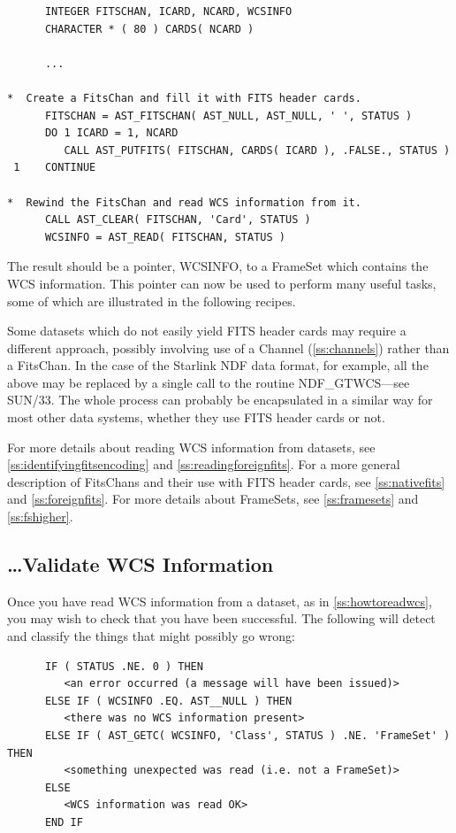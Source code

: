 \documentclass[twoside,11pt]{article}
\newcommand{\htmlref}[2]{#1}
\newcommand{\xref}[3]{#1}
\newcommand{\secref}[1]{\S\ref{#1}}
\renewcommand{\secref}[1]{\ref{#1}}
\begin{document}
\small
\begin{verbatim}
      INTEGER FITSCHAN, ICARD, NCARD, WCSINFO
      CHARACTER * ( 80 ) CARDS( NCARD )

      ...

*  Create a FitsChan and fill it with FITS header cards.
      FITSCHAN = AST_FITSCHAN( AST_NULL, AST_NULL, ' ', STATUS )
      DO 1 ICARD = 1, NCARD
         CALL AST_PUTFITS( FITSCHAN, CARDS( ICARD ), .FALSE., STATUS )
 1    CONTINUE

*  Rewind the FitsChan and read WCS information from it.
      CALL AST_CLEAR( FITSCHAN, 'Card', STATUS )
      WCSINFO = AST_READ( FITSCHAN, STATUS )
\end{verbatim}
\normalsize

The result should be a pointer, WCSINFO, to a \htmlref{FrameSet}{FrameSet} which contains
the WCS information. This pointer can now be used to perform many
useful tasks, some of which are illustrated in the following recipes.

Some datasets which do not easily yield FITS header cards may require
a different approach, possibly involving use of a \htmlref{Channel}{Channel}
(\secref{ss:channels}) rather than a \htmlref{FitsChan}{FitsChan}. In the case of the
Starlink NDF data format, for example, all the above may be replaced
by a single call to the routine
\xref{NDF\_GTWCS}{sun33}{NDF_GTWCS}---see \xref{SUN/33}{sun33}{}.  The
whole process can probably be encapsulated in a similar way for most
other data systems, whether they use FITS header cards or not.

For more details about reading WCS information from datasets, see
\secref{ss:identifyingfitsencoding} and
\secref{ss:readingforeignfits}. For a more general description of
FitsChans and their use with FITS header cards, see
\secref{ss:nativefits} and \secref{ss:foreignfits}. For more details
about FrameSets, see \secref{ss:framesets} and \secref{ss:fshigher}.

\subsection{\ldots Validate WCS Information}

Once you have read WCS information from a dataset, as in
\secref{ss:howtoreadwcs}, you may wish to check that you have been
successful. The following will detect and classify the things that
might possibly go wrong:

\small
\begin{verbatim}
      IF ( STATUS .NE. 0 ) THEN
         <an error occurred (a message will have been issued)>
      ELSE IF ( WCSINFO .EQ. AST__NULL ) THEN
         <there was no WCS information present>
      ELSE IF ( AST_GETC( WCSINFO, 'Class', STATUS ) .NE. 'FrameSet' ) THEN
         <something unexpected was read (i.e. not a FrameSet)>
      ELSE
         <WCS information was read OK>
      END IF
\end{verbatim}
\normalsize
\end{document}
